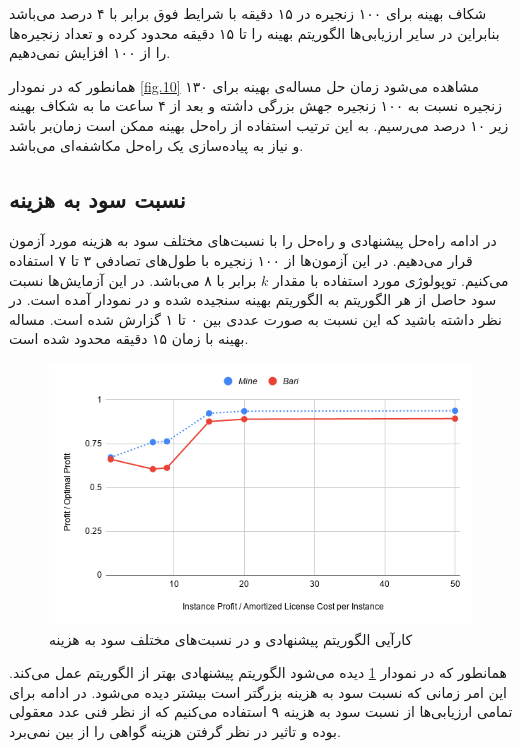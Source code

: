 شکاف بهینه برای ۱۰۰ زنجیره در ۱۵ دقیقه با شرایط فوق برابر با ۴ درصد می‌باشد بنابراین
در سایر ارزیابی‌ها الگوریتم بهینه را تا ۱۵ دقیقه محدود کرده و تعداد زنجیره‌ها را از ۱۰۰ افزایش نمی‌دهیم.

همانطور که در نمودار \ref{fig.10} مشاهده می‌شود زمان حل مساله‌ی بهینه برای ۱۳۰ زنجیره نسبت به ۱۰۰ زنجیره جهش بزرگی داشته
و بعد از ۴ ساعت ما به شکاف بهینه زیر ۱۰ درصد می‌رسیم.
به این ترتیب استفاده از راه‌حل بهینه ممکن است زمان‌بر باشد و نیاز به پیاده‌سازی یک راه‌حل مکاشفه‌ای می‌باشد.

\subsection{نسبت سود به هزینه}

در ادامه راه‌حل پیشنهادی و راه‌حل \cite{Bari2015} را با نسبت‌های مختلف سود به هزینه مورد آزمون قرار می‌دهیم. 
در این آزمون‌ها از ۱۰۰ زنجیره با طول‌های تصادفی ۳ تا ۷ استفاده می‌کنیم.
توپولوژی مورد استفاده
با مقدار \(k\)
برابر با ۸
می‌باشد.
در این آزمایش‌ها نسبت سود حاصل از هر الگوریتم به الگوریتم بهینه سنجیده شده و در نمودار آمده است.
در نظر داشته باشید که این نسبت به صورت عددی بین ۰ تا ۱ گزارش شده است.
مساله بهینه با زمان ۱۵ دقیقه محدود شده است.


\begin{figure}[h]
\center\includegraphics[scale=.5]{images/chart-1}
\caption{کارآیی الگوریتم پیشنهادی و \cite{Bari2015} در نسبت‌های مختلف سود به هزینه}
\label{fig.4}
\end{figure}

همانطور که در نمودار \ref{fig.4} دیده می‌شود الگوریتم پیشنهادی بهتر از الگوریتم \cite{Bari2015} عمل می‌کند.
این امر زمانی که نسبت سود به هزینه بزرگتر است بیشتر دیده می‌شود.
در ادامه برای تمامی ارزیابی‌ها از نسبت سود به هزینه ۹ استفاده می‌کنیم که از نظر فنی عدد معقولی بوده و تاثیر در نظر گرفتن هزینه گواهی را از بین نمی‌برد.


